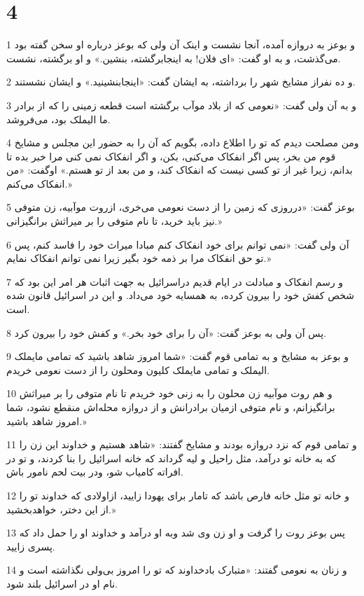 \chapter{4}

\par 1 و بوعز به دروازه آمده، آنجا نشست و اینک آن ولی که بوعز درباره او سخن گفته بود می‌گذشت، و به او گفت: «ای فلان! به اینجابرگشته، بنشین.» و او برگشته، نشست.
\par 2 و ده نفراز مشایخ شهر را برداشته، به ایشان گفت: «اینجابنشینید.» و ایشان نشستند.
\par 3 و به آن ولی گفت: «نعومی که از بلاد موآب برگشته است قطعه زمینی را که از برادر ما الیملک بود، می‌فروشد.
\par 4 ومن مصلحت دیدم که تو را اطلاع داده، بگویم که آن را به حضور این مجلس و مشایخ قوم من بخر، پس اگر انفکاک می‌کنی، بکن، و اگر انفکاک نمی کنی مرا خبر بده تا بدانم، زیرا غیر از تو کسی نیست که انفکاک کند، و من بعد از تو هستم.» اوگفت: «من انفکاک می‌کنم.»
\par 5 بوعز گفت: «درروزی که زمین را از دست نعومی می‌خری، ازروت موآبیه، زن متوفی نیز باید خرید، تا نام متوفی را بر میراثش برانگیزانی.»
\par 6 آن ولی گفت: «نمی توانم برای خود انفکاک کنم مبادا میراث خود را فاسد کنم، پس تو حق انفکاک مرا بر ذمه خود بگیر زیرا نمی توانم انفکاک نمایم.»
\par 7 و رسم انفکاک و مبادلت در ایام قدیم دراسرائیل به جهت اثبات هر امر این بود که شخص کفش خود را بیرون کرده، به همسایه خود می‌داد. و این در اسرائیل قانون شده است.
\par 8 پس آن ولی به بوعز گفت: «آن را برای خود بخر.» و کفش خود را بیرون کرد.
\par 9 و بوعز به مشایخ و به تمامی قوم گفت: «شما امروز شاهد باشید که تمامی مایملک الیملک و تمامی مایملک کلیون ومحلون را از دست نعومی خریدم.
\par 10 و هم روت موآبیه زن محلون را به زنی خود خریدم تا نام متوفی را بر میراثش برانگیزانم، و نام متوفی ازمیان برادرانش و از دروازه محله‌اش منقطع نشود، شما امروز شاهد باشید.»
\par 11 و تمامی قوم که نزد دروازه بودند و مشایخ گفتند: «شاهد هستیم و خداوند این زن را که به خانه تو درآمد، مثل راحیل و لیه گرداند که خانه اسرائیل را بنا کردند، و تو در افراته کامیاب شو، ودر بیت لحم نامور باش. 
\par 12 و خانه تو مثل خانه فارص باشد که تامار برای یهودا زایید، ازاولادی که خداوند تو را از این دختر، خواهدبخشید.»
\par 13 پس بوعز روت را گرفت و او زن وی شد وبه او درآمد و خداوند او را حمل داد که پسری زایید.
\par 14 و زنان به نعومی گفتند: «متبارک بادخداوند که تو را امروز بی‌ولی نگذاشته است و نام او در اسرائیل بلند شود.
